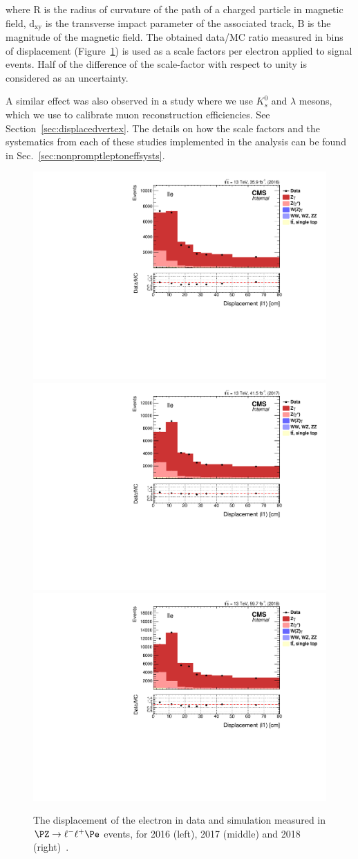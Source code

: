 \noindent where $\mathrm{R}$ is the radius of curvature of the path of
a charged particle in magnetic field, $\mathrm{d_{xy}}$ is the
transverse impact parameter of the associated track, $\mathrm{B}$ is the
magnitude of the magnetic field. The obtained data/MC ratio measured in bins of displacement
(Figure~\ref{fig:convdispl}) is used as a scale factors per
electron applied to signal events.  Half of the difference of the
scale-factor with respect to unity is considered as an uncertainty.

A similar effect was also observed in a study where we use $K_s^0$  and $\lambda$ mesons, which we use to calibrate \displ muon reconstruction efficiencies. See Section~\ref{sec:displacedvertex}.
The details on how the scale factors and the systematics from each of these studies implemented in the analysis can be found in Sec.~\ref{sec:nonpromptleptoneffsysts}.

\begin{figure}[h]
  \centering
  \includegraphics[width=.45\textwidth]{Figures/c6/efficiencies/Convz/Nonprompt1DisplCoarse_lle_2016.pdf}
  \includegraphics[width=.45\textwidth]{Figures/c6/efficiencies/Convz/Nonprompt1DisplCoarse_lle_2017.pdf}\\
  \includegraphics[width=.45\textwidth]{Figures/c6/efficiencies/Convz/Nonprompt1DisplCoarse_lle_2018.pdf}
  \caption{The displacement of the \Displ electron in data
  and simulation measured in $\PZ\to\ell^-\ell^+\Pe$ events, 
  for 2016 (left), 2017 (middle) and 2018 (right)~\cite{convz}.}
  \label{fig:convdispl}
\end{figure}


